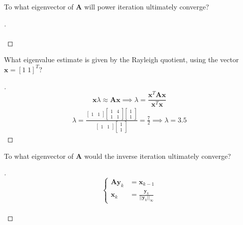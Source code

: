 \documentclass[12pt]{article}
\newenvironment{exercise}[2][Exercise]{\begin{trivlist}
\item[\hskip \labelsep {\bfseries #1}\hskip \labelsep {\bfseries #2.}]}{\end{trivlist}}
\begin{document}
\begin{exercise}{6}
	To what eigenvector of $\bm{A}$ will power iteration ultimately converge?
\end{exercise}
\begin{proof}[]
	\\	
	\vspace{-5mm}\\
\end{proof}

\pagebreak
\begin{exercise}{7}
	What eigenvalue estimate is given by the Rayleigh quotient, using the vector $\bm{x} = [1\;1]^T$?
\end{exercise}
\begin{proof}[]
	\vspace{-7mm}
	\[ \bm{x} \lambda \approx \bm{Ax} \implies \lambda = \frac{\bm{x}^T \bm{A x}}{\bm{x}^T \bm{x}} \]
	\begin{align*}
		\lambda =
			\frac{\begin{bmatrix} 1 & 1 \end{bmatrix} \begin{bmatrix} 1 & 4 \\ 1 & 1 \end{bmatrix} \begin{bmatrix} 1 \\ 1 \end{bmatrix}}{\begin{bmatrix} 1 & 1 \end{bmatrix} \begin{bmatrix}1 \\ 1 \end{bmatrix}}
		= \frac{7}{2} \implies \boxed{\lambda = 3.5}
	\end{align*}
\end{proof}
\begin{exercise}{8}
	To what eigenvector of $\bm{A}$ would the inverse iteration ultimately converge?
\end{exercise}
\begin{proof}[]
	\vspace{-5mm}
	\[\begin{cases}
		\bm{A y}_k &= \bm{x}_{k-1} \\ \bm{x}_k &= \frac{\bm{y}_k}{||\bm{y}_k||_\infty}
	\end{cases} \]
	\vspace{-5mm} \\
	
\end{proof}
\end{document}
